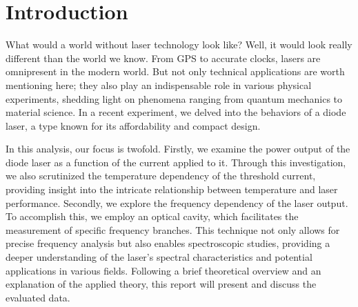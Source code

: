 \section{Introduction}

What would a world without laser technology look like? Well, it would look really different than the world we know. From GPS to accurate clocks, lasers are omnipresent in the modern world. But not only technical applications are worth mentioning here; they also play an indispensable role in various physical experiments, shedding light on phenomena ranging from quantum mechanics to material science. In a recent experiment, we delved into the behaviors of a diode laser, a type known for its affordability and compact design.

In this analysis, our focus is twofold. Firstly, we examine the power output of the diode laser as a function of the current applied to it. Through this investigation, we also scrutinized the temperature dependency of the threshold current, providing insight into the intricate relationship between temperature and laser performance. Secondly, we explore the frequency dependency of the laser output. To accomplish this, we employ an optical cavity, which facilitates the measurement of specific frequency branches. This technique not only allows for precise frequency analysis but also enables spectroscopic studies, providing a deeper understanding of the laser's spectral characteristics and potential applications in various fields.
Following a brief theoretical overview and an explanation of the applied theory, this report will present and discuss the evaluated data.